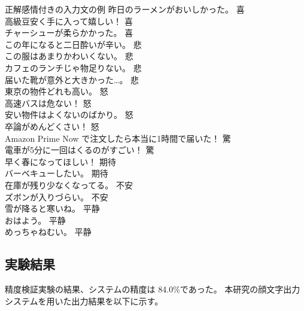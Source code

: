 \documentclass[11pt,a4j]{jsarticle}
\begin{document}
\begin{itembox}[l]{正解感情付きの入力文の例}
昨日のラーメンがおいしかった。 喜 \\
高級豆安く手に入って嬉しい！ 喜\\
チャーシューが柔らかかった。 喜\\
この年になると二日酔いが辛い。 悲\\
この服はあまりかわいくない。 悲\\
カフェのランチじゃ物足りない。 悲\\
届いた靴が意外と大きかった…。 悲\\
東京の物件どれも高い。 怒\\
高速バスは危ない！ 怒\\
安い物件はよくないのばかり。 怒\\
卒論がめんどくさい！ 怒\\
Amazon Prime Now で注文したら本当に1時間で届いた！ 驚\\
電車が5分に一回はくるのがすごい！ 驚\\
早く春になってほしい！ 期待\\
バーベキューしたい。 期待\\
在庫が残り少なくなってる。 不安\\
ズボンが入りづらい。 不安\\
雪が降ると寒いね。 平静\\
おはよう。 平静\\
めっちゃねむい。 平静\\
\end{itembox}

  \subsection{実験結果}
精度検証実験の結果、システムの精度は 84.0\%であった。
本研究の顔文字出力システムを用いた出力結果を以下に示す。
\end{document}
